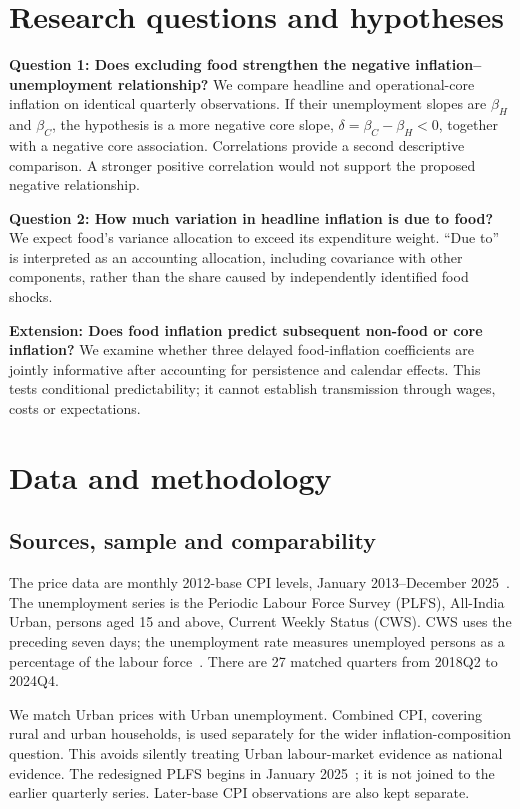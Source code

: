 \documentclass[10pt,a4paper]{article}
\begin{document}
\section{Research questions and hypotheses}

\textbf{Question 1: Does excluding food strengthen the negative inflation--unemployment relationship?} We compare headline and operational-core inflation on identical quarterly observations. If their unemployment slopes are $\beta_H$ and $\beta_C$, the hypothesis is a more negative core slope, $\delta=\beta_C-\beta_H<0$, together with a negative core association. Correlations provide a second descriptive comparison. A stronger positive correlation would not support the proposed negative relationship.

\textbf{Question 2: How much variation in headline inflation is due to food?} We expect food's variance allocation to exceed its expenditure weight. ``Due to'' is interpreted as an accounting allocation, including covariance with other components, rather than the share caused by independently identified food shocks.

\textbf{Extension: Does food inflation predict subsequent non-food or core inflation?} We examine whether three delayed food-inflation coefficients are jointly informative after accounting for persistence and calendar effects. This tests conditional predictability; it cannot establish transmission through wages, costs or expectations.

\section{Data and methodology}
\subsection{Sources, sample and comparability}

The price data are monthly 2012-base CPI levels, January 2013--December 2025~\cite{cpiapi}. The unemployment series is the Periodic Labour Force Survey (PLFS), All-India Urban, persons aged 15 and above, Current Weekly Status (CWS). CWS uses the preceding seven days; the unemployment rate measures unemployed persons as a percentage of the labour force~\cite{plfs2024}. There are 27 matched quarters from 2018Q2 to 2024Q4.

\newpage
We match Urban prices with Urban unemployment. Combined CPI, covering rural and urban households, is used separately for the wider inflation-composition question. This avoids silently treating Urban labour-market evidence as national evidence. The redesigned PLFS begins in January 2025~\cite{plfschange}; it is not joined to the earlier quarterly series. Later-base CPI observations are also kept separate.
\end{document}
